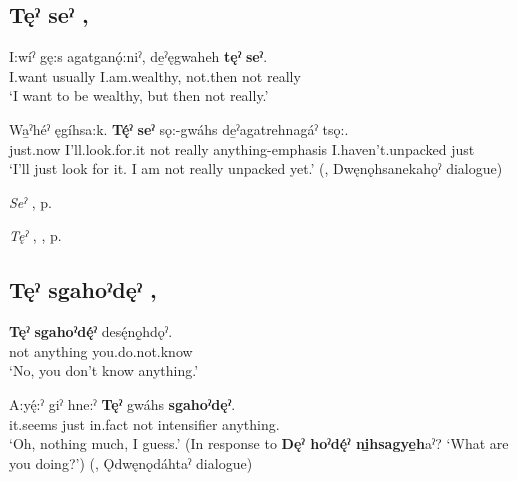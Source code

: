 \subsection*{\textbf{Tęˀ seˀ} , } \label{p:[tęˀ seˀ]}

\ea
\label{ex:tpart56}
\gll I:wíˀ gę:s agatganǫ́:niˀ, de̱ˀęgwaheh \textbf{tęˀ} \textbf{seˀ}.\\
I.want usually I.am.wealthy, not.then not really\\
\glt ‘I want to be wealthy, but then not really.’
\z

\ea
\label{ex:tpart57}
\gll Wa̱ˀhéˀ ęgíhsa:k. \textbf{Tę́ˀ} \textbf{seˀ} sǫ:-gwáhs de̱ˀagatrehnagáˀ tsǫ:.\\
just.now I’ll.look.for.it not really anything-emphasis I.haven’t.unpacked just\\
\glt ‘I’ll just look for it. I am not really unpacked yet.’ (\cite[41]{mithun_watewayestanih_1984}, Dwęnǫhsanekahǫˀ dialogue)
\z

\begin{CayugaRelated}
\item \textit{Seˀ} , p. \pageref{p:[seˀ]}\\
\item \textit{Tęˀ} , , p. \pageref{p:[tęˀ]}
\end{CayugaRelated}

\subsection*{\textbf{Tęˀ sgahoˀdęˀ} , } \label{p:[tęˀ sg̱ahoˀdęˀ]}

\ea
\label{ex:tpart58}
\gll \textbf{Tęˀ} \textbf{sgahoˀdę́ˀ} desę́nǫ̱hdǫˀ.\\
not anything you.do.not.know\\
\glt ‘No, you don’t know anything.’
\z

\ea
\label{ex:tpart59}
\gll A:yę́:ˀ giˀ hne:ˀ \textbf{Tęˀ} gwáhs \textbf{sgahoˀdęˀ}.\\
it.seems just in.fact not intensifier anything.\\
\glt ‘Oh, nothing much, I guess.’ (In response to \textbf{Dęˀ hoˀdę́ˀ ni̱hsagye̱h}aˀ? `What are you doing?’) (\cite[41]{mithun_watewayestanih_1984}, Ǫdwęnǫdáhtaˀ dialogue)
\z

